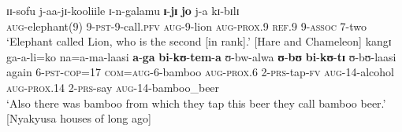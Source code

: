 \begin{exe}
\ex \label{exPRSnonPSTRelativeTimeless1}\gll ɪɪ-sofu j-aa-jɪ-kooliile ɪ-n-galamu \textbf{ɪ}-\textbf{jɪ} \textbf{jo} j-a kɪ-bɪlɪ\\
\textsc{aug}-elephant(9) 9-\textsc{pst}-9-call.\textsc{pfv} \textsc{aug}-9-lion \textsc{aug}-\textsc{prox.9} \textsc{ref.9} 9-\textsc{assoc} 7-two\\
\glt \lq Elephant called Lion, who is the second [in rank].' [Hare and Chameleon]
\ex \label{exPRSnonPSTRelativeTimeless2}\gll kangɪ ga-a-li=ko na=a-ma-laasi \textbf{a}-\textbf{ga} \textbf{bi}-\textbf{kʊ}-\textbf{tem}-\textbf{a} ʊ-bw-alwa \textbf{ʊ}-\textbf{bʊ} \textbf{bi}-\textbf{kʊ}-\textbf{tɪ} ʊ-bʊ-laasi\\
again 6-\textsc{pst}-\textsc{cop}=17 \textsc{com}=\textsc{aug}-6-bamboo \textsc{aug}-\textsc{prox.6} 2-\textsc{prs}-tap-\textsc{fv} \textsc{aug}-14-alcohol \textsc{aug}-\textsc{prox.14} 2-\textsc{prs}-say \textsc{aug}-14-bamboo\_beer\\
\glt \lq Also there was bamboo from which they tap this beer they call bamboo beer.' [Nyakyusa houses of long ago]
\end{exe}
